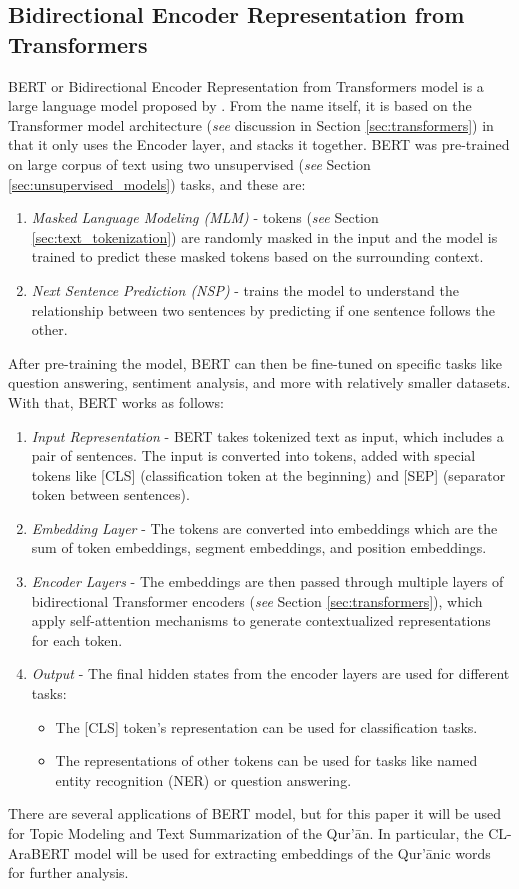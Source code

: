 \subsection{Bidirectional Encoder Representation from Transformers}\label{sec:bert}
BERT or Bidirectional Encoder Representation from Transformers model is a large language model proposed by . From the name itself, it is based on the Transformer model architecture (\textit{see} discussion in Section \ref{sec:transformers}) in that it only uses the Encoder layer, and stacks it together. BERT was pre-trained on large corpus of text using two unsupervised (\textit{see} Section \ref{sec:unsupervised_models}) tasks, and these are:
\begin{enumerate}
    \item \textit{Masked Language Modeling (MLM)} - tokens (\textit{see} Section \ref{sec:text_tokenization}) are randomly masked in the input and the model is trained to predict these masked tokens based on the surrounding context.
    \item \textit{Next Sentence Prediction (NSP)} - trains the model to understand the relationship between two sentences by predicting if one sentence follows the other.
\end{enumerate}
After pre-training the model, BERT can then be fine-tuned on specific tasks like question answering, sentiment analysis, and more with relatively smaller datasets. With that, BERT works as follows: 
\begin{enumerate}
    \item \textit{Input Representation} - BERT takes tokenized text as input, which includes a pair of sentences. The input is converted into tokens, added with special tokens like [CLS] (classification token at the beginning) and [SEP] (separator token between sentences).
    \item \textit{Embedding Layer} - The tokens are converted into embeddings which are the sum of token embeddings, segment embeddings, and position embeddings.
    \item \textit{Encoder Layers} - The embeddings are then passed through multiple layers of bidirectional Transformer encoders (\textit{see} Section \ref{sec:transformers}), which apply self-attention mechanisms to generate contextualized representations for each token.
    \item \textit{Output} - The final hidden states from the encoder layers are used for different tasks:
    \begin{itemize}
        \item The [CLS] token's representation can be used for classification tasks.
        \item The representations of other tokens can be used for tasks like named entity recognition (NER) or question answering.
    \end{itemize}
\end{enumerate}
There are several applications of BERT model, but for this paper it will be used for Topic Modeling and Text Summarization of the Qur'\=an. In particular, the CL-AraBERT model will be used for extracting embeddings of the Qur'\=anic words for further analysis.

